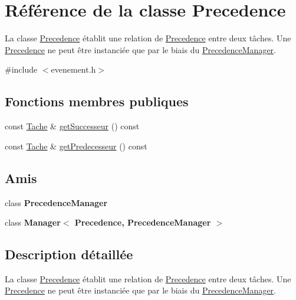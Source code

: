 \hypertarget{class_precedence}{}\section{Référence de la classe Precedence}
\label{class_precedence}


La classe \hyperlink{class_precedence}{Precedence} établit une relation de \hyperlink{class_precedence}{Precedence} entre deux tâches. Une \hyperlink{class_precedence}{Precedence} ne peut être instanciée que par le biais du \hyperlink{class_precedence_manager}{Precedence\+Manager}.  




{\ttfamily \#include $<$evenement.\+h$>$}

\subsection*{Fonctions membres publiques}
\begin{DoxyCompactItemize}
\item 
const \hyperlink{class_tache}{Tache} \& \hyperlink{class_precedence_a807169416212d0a2d83ad8791b91985b}{get\+Successeur} () const 
\item 
const \hyperlink{class_tache}{Tache} \& \hyperlink{class_precedence_af9567ba90b3b024ae3b06a034438b2b0}{get\+Predecesseur} () const 
\end{DoxyCompactItemize}
\subsection*{Amis}
\begin{DoxyCompactItemize}
\item 
\hypertarget{class_precedence_a49a568edb7039450f0fa2feb2f5f4dfa}{}class {\bfseries Precedence\+Manager}\label{class_precedence_a49a568edb7039450f0fa2feb2f5f4dfa}

\item 
\hypertarget{class_precedence_a542fcb155313e1054cab81875cf9d81f}{}class {\bfseries Manager$<$ Precedence, Precedence\+Manager $>$}\label{class_precedence_a542fcb155313e1054cab81875cf9d81f}

\end{DoxyCompactItemize}


\subsection{Description détaillée}
La classe \hyperlink{class_precedence}{Precedence} établit une relation de \hyperlink{class_precedence}{Precedence} entre deux tâches. Une \hyperlink{class_precedence}{Precedence} ne peut être instanciée que par le biais du \hyperlink{class_precedence_manager}{Precedence\+Manager}. 

